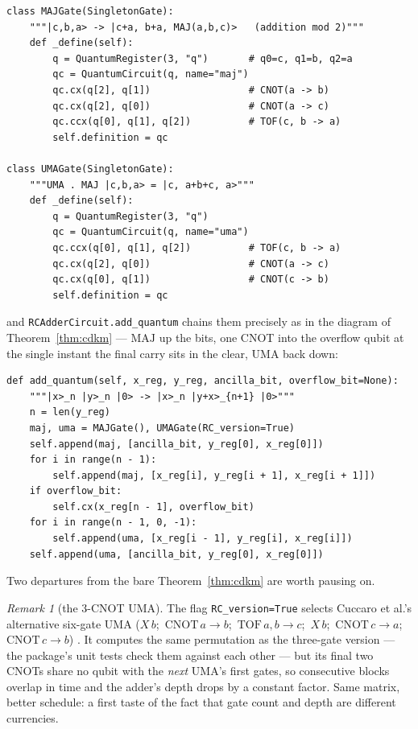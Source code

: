 \documentclass[11pt]{article}
\newcommand{\MAJ}{\mathrm{MAJ}}
\newcommand{\UMA}{\mathrm{UMA}}
\newcommand{\TOF}{\mathrm{TOF}}
\newcommand{\CNOT}{\mathrm{CNOT}}
\newcommand{\code}[1]{\texttt{#1}}
\theoremstyle{plain}
\theoremstyle{remark}
\newtheorem*{remark}{Remark}
\begin{document}
\begin{lstlisting}
class MAJGate(SingletonGate):
    """|c,b,a> -> |c+a, b+a, MAJ(a,b,c)>   (addition mod 2)"""
    def _define(self):
        q = QuantumRegister(3, "q")       # q0=c, q1=b, q2=a
        qc = QuantumCircuit(q, name="maj")
        qc.cx(q[2], q[1])                 # CNOT(a -> b)
        qc.cx(q[2], q[0])                 # CNOT(a -> c)
        qc.ccx(q[0], q[1], q[2])          # TOF(c, b -> a)
        self.definition = qc

class UMAGate(SingletonGate):
    """UMA . MAJ |c,b,a> = |c, a+b+c, a>"""
    def _define(self):
        q = QuantumRegister(3, "q")
        qc = QuantumCircuit(q, name="uma")
        qc.ccx(q[0], q[1], q[2])          # TOF(c, b -> a)
        qc.cx(q[2], q[0])                 # CNOT(a -> c)
        qc.cx(q[0], q[1])                 # CNOT(c -> b)
        self.definition = qc
\end{lstlisting}

\noindent
and \code{RCAdderCircuit.add\_quantum} chains them precisely as in the diagram of
Theorem~\ref{thm:cdkm} --- $\MAJ$ up the bits, one CNOT into the overflow qubit at the single
instant the final carry sits in the clear, $\UMA$ back down:

\begin{lstlisting}
def add_quantum(self, x_reg, y_reg, ancilla_bit, overflow_bit=None):
    """|x>_n |y>_n |0> -> |x>_n |y+x>_{n+1} |0>"""
    n = len(y_reg)
    maj, uma = MAJGate(), UMAGate(RC_version=True)
    self.append(maj, [ancilla_bit, y_reg[0], x_reg[0]])
    for i in range(n - 1):
        self.append(maj, [x_reg[i], y_reg[i + 1], x_reg[i + 1]])
    if overflow_bit:
        self.cx(x_reg[n - 1], overflow_bit)
    for i in range(n - 1, 0, -1):
        self.append(uma, [x_reg[i - 1], y_reg[i], x_reg[i]])
    self.append(uma, [ancilla_bit, y_reg[0], x_reg[0]])
\end{lstlisting}

\noindent
Two departures from the bare Theorem~\ref{thm:cdkm} are worth pausing on.

\begin{remark}[the $3$-CNOT $\UMA$]
The flag \code{RC\_version=True} selects Cuccaro et al.'s alternative six-gate $\UMA$
($X\,b$;\ $\CNOT\,a\!\to\!b$;\ $\TOF\,a,b\!\to\!c$;\ $X\,b$;\ $\CNOT\,c\!\to\!a$;\
$\CNOT\,c\!\to\!b$) \cite{cuccaro}. It computes the same permutation as the three-gate version ---
the package's unit tests check them against each other --- but its final two CNOTs share no qubit
with the \emph{next} $\UMA$'s first gates, so consecutive blocks overlap in time and the adder's
depth drops by a constant factor. Same matrix, better schedule: a first taste of the fact that gate
count and depth are different currencies.
\end{remark}
\end{document}
